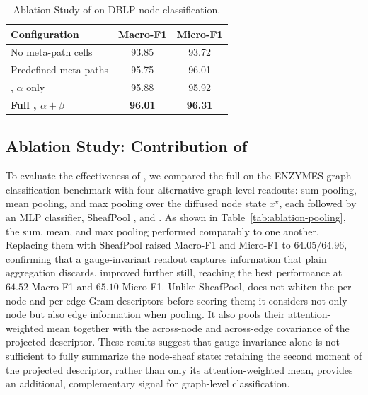\begin{table}[H]
  \centering
  \caption{Ablation Study of \ampss{} on DBLP node classification.}
  \label{tab:ablation-schema}
  \small
  \begin{tabular}{lcc}
    \toprule
    \textbf{Configuration} & Macro-F1 & Micro-F1 \\
    \midrule
    No meta-path cells & 93.85 & 93.72 \\
    Predefined meta-paths & 95.75 & 96.01 \\
    \ampss{}, $\alpha$ only & 95.88 & 95.92 \\
    \textbf{Full \ampss{}, $\alpha+\beta$} & \textbf{96.01} & \textbf{96.31} \\
    \bottomrule
  \end{tabular}
\end{table}

\subsection{Ablation Study: Contribution of {\sheafconvpool{}}}

To evaluate the effectiveness of \sheafconvpool{}, we compared the full \method{} on the ENZYMES
graph-classification benchmark with four alternative graph-level readouts: sum pooling, mean
pooling, and max pooling over the diffused node state $x^\star$, each followed by an MLP
classifier, SheafPool \cite{braithwaite2024heterogeneous}, and \sheafconvpool{}. As shown in
Table~\ref{tab:ablation-pooling}, the sum, mean, and max pooling performed comparably to
one another. Replacing them with SheafPool raised Macro-F1 and Micro-F1 to $64.05/64.96$,
confirming that a gauge-invariant readout captures information that plain aggregation discards.
\sheafconvpool{} improved further still, reaching the best performance at $64.52$ Macro-F1 and
$65.10$ Micro-F1. Unlike SheafPool, \sheafconvpool{}
does not whiten the per-node and per-edge Gram descriptors before scoring them; it considers not only node but also edge information when pooling. It also pools their attention-weighted mean together with the across-node and across-edge covariance of the
projected descriptor. These results suggest that gauge invariance alone is not sufficient to fully
summarize the node-sheaf state: retaining the second moment of the projected descriptor, rather
than only its attention-weighted mean, provides an additional, complementary signal for
graph-level classification.

